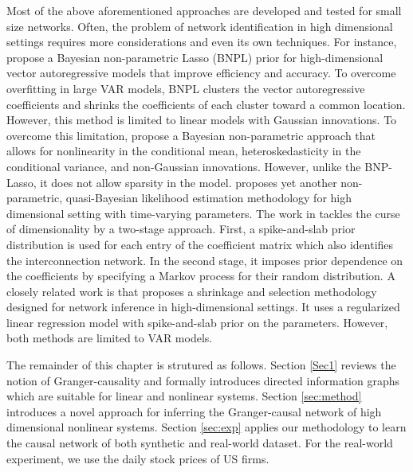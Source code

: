 Most of the above aforementioned approaches are developed and tested for small size networks. 
Often, the problem of network identification in high dimensional settings requires more considerations and even its own techniques. 
For instance, \citet{billio2019bayesian} propose a Bayesian non-parametric Lasso (BNPL) prior for high-dimensional vector autoregressive models that improve efficiency and accuracy. 
To overcome overfitting in large VAR models, BNPL clusters the vector autoregressive coefficients and shrinks the coefficients of each cluster toward a common location.
However, this method is limited to linear models with Gaussian innovations.
To overcome this limitation, \citet{kalli2018bayesian} propose a Bayesian non-parametric approach that allows for nonlinearity in the conditional mean, heteroskedasticity in the conditional variance, and non-Gaussian innovations. However, unlike the BNP-Lasso, it does not allow sparsity in the model.
\citet{petrova2019quasi} proposes yet another non-parametric, quasi-Bayesian likelihood estimation methodology for high dimensional setting with time-varying parameters. 
The work in \citet{iacopini2019bayesian} tackles the curse of dimensionality by a two-stage approach. First, a spike-and-slab prior distribution is used for each entry of the coefficient matrix which also identifies the interconnection network.
In the second stage, it imposes prior dependence on the coefficients by specifying a Markov process for their random distribution. 
A closely related work is \citet{bernardi2019high} that proposes a shrinkage and selection methodology designed for network inference in high-dimensional settings. It uses a regularized linear regression model with spike-and-slab prior on the parameters.
However, both methods are limited to VAR models.



The remainder of this chapter is strutured as follows. 
Section \ref{Sec1} reviews the notion of Granger-causality and formally introduces directed information graphs which are suitable for linear and nonlinear systems. 
Section \ref{sec:method} introduces a novel approach for inferring the Granger-causal network of high dimensional nonlinear systems. 
Section \ref{sec:exp} applies our methodology to learn the causal network of both synthetic and real-world dataset. For the real-world experiment, we use the daily stock prices of US firms.

